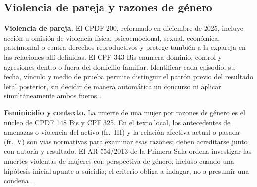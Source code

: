 \documentclass[spanish,letterpaper,oneside]{article}
\begin{document}
\subsection*{Violencia de pareja y razones de género}
\textbf{Violencia de pareja.} El CPDF 200, reformado en diciembre de 2025, incluye acción u omisión de violencia física, psicoemocional, sexual, económica, patrimonial o contra derechos reproductivos y protege también a la expareja en las relaciones allí definidas. El CPF 343 Bis enumera dominio, control y agresiones dentro o fuera del domicilio familiar. Identificar cada episodio, su fecha, vínculo y medio de prueba permite distinguir el patrón previo del resultado letal posterior, sin decidir de manera automática un concurso ni aplicar simultáneamente ambos fueros \citep{cpdfS3Consolidado,cpfOficial2026}.

\textbf{Feminicidio y contexto.} La muerte de una mujer por razones de género es el núcleo de CPDF 148 Bis y CPF 325. En el texto local, los antecedentes de amenazas o violencia del activo (fr.~III) y la relación afectiva actual o pasada (fr.~V) son vías normativas para examinar esas razones; deben acreditarse junto con autoría y resultado. El AR 554/2013 de la Primera Sala ordena investigar las muertes violentas de mujeres con perspectiva de género, incluso cuando una hipótesis inicial apunte a suicidio; el criterio obliga a indagar, no a presumir una condena \citep{cpdfS3Consolidado,cpfOficial2026,scjnAR5542013}.
\end{document}
